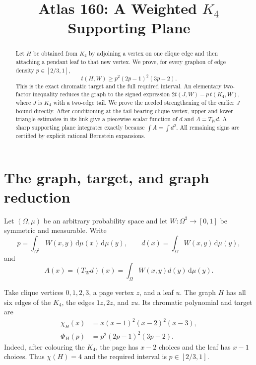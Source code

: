 \documentclass[11pt]{article}
\title{Atlas 160: A Weighted $K_4$ Supporting Plane}
\author{}
\date{}
\newcommand{\dd}{\,\mathrm d}
\begin{document}
\maketitle

\begin{abstract}
Let $H$ be obtained from $K_4$ by adjoining a vertex on one clique edge
and then attaching a pendant leaf to that new vertex.  We prove, for every
graphon of edge density $p\in[2/3,1]$,
\[
 t(H,W)\ge p^2(2p-1)^2(3p-2).
\]
This is the exact chromatic target and the full required interval.  An
elementary two-factor inequality reduces the graph to the signed expression
$2t(J,W)-p\,t(K_4,W)$, where $J$ is $K_4$ with a two-edge tail.  We prove the
needed strengthening of the earlier $J$ bound directly.  After conditioning
at the tail-bearing clique vertex, upper and lower triangle estimates in its
link give a piecewise scalar function of $d$ and $A=T_Wd$.  A sharp
supporting plane integrates exactly because $\int A=\int d^2$.  All
remaining signs are certified by explicit rational Bernstein expansions.
\end{abstract}


\section{The graph, target, and graph reduction}

Let $(\Omega,\mu)$ be an arbitrary probability space and let
$W\colon\Omega^2\to[0,1]$ be symmetric and measurable.  Write
\[
 p=\int_{\Omega^2}W(x,y)\dd\mu(x)\dd\mu(y),
 \qquad
 d(x)=\int_\Omega W(x,y)\dd\mu(y),
\]
and
\[
 A(x)=(T_Wd)(x)=\int_\Omega W(x,y)d(y)\dd\mu(y).
\]

Take clique vertices $0,1,2,3$, a page vertex $z$, and a leaf $u$.
The graph $H$ has all six edges of the $K_4$, the edges $1z,2z$, and
$zu$.  Its chromatic polynomial and target are
\begin{align}
 \chi_H(x)&=x(x-1)^2(x-2)^2(x-3),\label{eq:chromatic}\\
 \Phi_H(p)&=p^2(2p-1)^2(3p-2).\label{eq:target}
\end{align}
Indeed, after colouring the $K_4$, the page has $x-2$ choices and the leaf
has $x-1$ choices.  Thus $\chi(H)=4$ and the required interval is
$p\in[2/3,1]$.
\end{document}
